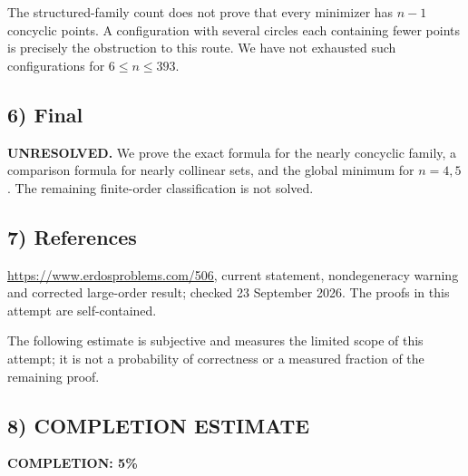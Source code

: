The structured-family count does not prove that every minimizer has $n-1$ concyclic points. A configuration with several circles each containing fewer points is precisely the obstruction to this route. We have not exhausted such configurations for $6\leq n\leq393$.

\subsection*{6) Final}
\textbf{UNRESOLVED.} We prove the exact formula for the nearly concyclic family, a comparison formula for nearly collinear sets, and the global minimum for $n=4,5$. The remaining finite-order classification is not solved.

\subsection*{7) References}
\url{https://www.erdosproblems.com/506}, current statement, nondegeneracy warning and corrected large-order result; checked 23 September 2026. The proofs in this attempt are self-contained.

The following estimate is subjective and measures the limited scope of this attempt; it is not a probability of correctness or a measured fraction of the remaining proof.
\subsection*{8) COMPLETION ESTIMATE}
\textbf{COMPLETION: 5\%}
